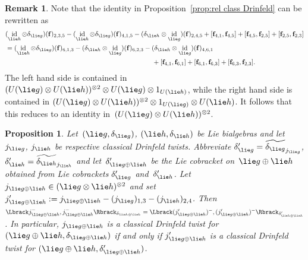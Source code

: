 \documentclass[12pt, reqno]{amsart}
\newcommand{\cybe}[1]{\mathbb{\Lbrack}#1,#1\mathbb{\Rbrack}}
\newtheorem{proposition}[theorem]{Proposition}
\theoremstyle{definition}
\newtheorem{remark}[theorem]{Remark}
\numberwithin{equation}{section}
\newcommand{\tensor}{\otimes}
\DeclareMathOperator{\id}{id}
\begin{document}
\begin{remark}\label{rem:trivial legs}
Note that the identity in Proposition~\ref{prop:rel class Drinfeld}
can be rewritten as 
\begin{align*}
&(\id_{\lie h}\tensor\delta_{\lie g})(\mathbf f)_{2,3,5}-
(\id_{\lie h}\tensor\delta_{\lie g})(\mathbf f)_{4,1,5}-
(\delta_{\lie h}\tensor\id_{\lie g})(\mathbf f)_{2,4,5}
+[\mathbf f_{4,1},\mathbf f_{4,5}]+[\mathbf f_{4,5},\mathbf f_{2,5}]+[\mathbf f_{2,5},\mathbf f_{2,3}]\\
&=(\id_{\lie h}\tensor\delta_{\lie g})(\mathbf f)_{6,1,3}-(\delta_{\lie h}\tensor \id_{\lie g})(\mathbf f)_{6,2,3}
-(\delta_{\lie h}\tensor \id_{\lie g})(\mathbf f)_{4,6,1}\\
&\mskip400mu+
[\mathbf f_{4,1},\mathbf f_{6,1}]+[\mathbf f_{6,1},\mathbf f_{6,3}]+[\mathbf f_{6,3},
\mathbf f_{2,3}].
\end{align*}
The left hand side is contained in~$(U(\lie g)\tensor U(\lie h))^{\tensor 2}\tensor U(\lie g)\tensor 1_{U(\lie h)}$, while the right hand side is contained in 
$(U(\lie g)\tensor U(\lie h))^{\tensor 2}\tensor 1_{U(\lie g)}\tensor U(\lie h)$.
It follows that this reduces to an identity in~$(U(\lie g)\tensor U(\lie h))^{\tensor 2}$.
\end{remark}
\begin{proposition}\label{prop:tensortwist}
Let~$(\lie g,\delta_{\lie g})$, $(\lie h,\delta_{\lie h})$ be 
Lie bialgebras and let~$ j _{\lie g}$, $ j _{\lie h}$
be respective classical Drinfeld twists. Abbreviate $\delta'_{\lie g}=
\widetilde{\delta_{\lie g}}_{ j _{\lie g}}$, 
$\delta'_{\lie h}=\widetilde{\delta_{\lie h}}_{ j _{\lie h}}$
and let~$\delta'_{\lie g\oplus\lie h}$ be the Lie cobracket on~$\lie g\oplus\lie h$
obtained from Lie cobrackets $\delta'_{\lie g}$ and~$\delta'_{\lie h}$.
Let~$ j _{\lie g\oplus\lie h}\in (\lie g\tensor \lie h)^{\tensor 2}$
and set~$ j '_{\lie g\oplus\lie h}:= j _{\lie g\oplus\lie h}-( j _{\lie g})_{1,3}-( j _{\lie h})_{2,4}$. Then
$\cybe{ j ^-_{\lie g\oplus\lie h}}_{\delta_{\lie h\oplus\lie h}}=
\cybe{( j '_{\lie g\oplus\lie h})^-}_{\delta'_{\lie h\oplus\lie h}}$.
In particular, $ j _{\lie g\oplus \lie h}$ is a classical Drinfeld 
twist for~$(\lie g\oplus\lie h,\delta_{\lie g\oplus\lie h})$ if and only if
$ j _{\lie g\oplus\lie h}'$ is
a classical Drinfeld twist for $(\lie g\oplus\lie h,\delta'_{\lie g\oplus\lie h})$.
\end{proposition}
\end{document}
